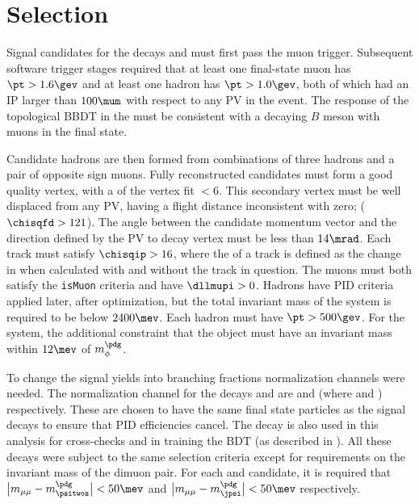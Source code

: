 \section{Selection}

Signal candidates for the decays \btokpipimumu and \btophikmumu must first pass the \lone muon
trigger.
Subsequent software trigger stages required that at least one final-state muon has $\pt>1.6\gev$
and at least one hadron has $\pt>1.0\gev$, both of which had an IP larger than $100\mum$ with
respect to any PV in the event.
The response of the topological BBDT in the \hlttwo must be consistent with a decaying $B$ meson
with muons in the final state.


Candidate \Bp hadrons are then formed from combinations of three hadrons and a pair of opposite
sign muons.
Fully reconstructed candidates must form a good quality vertex, with a \chisq of the vertex fit
$<6$.
This secondary vertex must be well displaced from any PV, having a flight distance inconsistent
with zero; ($\chisqfd>121$).
The angle between the \Bp candidate momentum vector and the direction defined by the PV to \Bp decay
vertex must be less than $14\mrad$.
Each track must satisfy $\chisqip>16$, where the \chisqip of a track is defined as the change in
\chisqip when calculated with and without the track in question.
The muons must both satisfy the {\tt isMuon} criteria and have $\dllmupi>0$.
Hadrons have PID criteria applied later, after optimization, but the total invariant mass of the
\kpipi system is required to be below $2400\mev$.
Each hadron must have $\pt>500\gev$.
For the \phik system, the additional constraint that the \decay{\phi}{\kk} object must have an
invariant mass within $12\mev$ of $m_\phi^\pdg$.

To change the signal yields into branching fractions normalization channels were needed.
The normalization channel for the decays \btokpipimumu and \btophikmumu are \btopsitwosk and
\btojpsiphik (where \psitwostojpsipipi and \jpsitomumu) respectively.
These are chosen to have the same final state particles as the signal decays to ensure that PID
efficiencies cancel.
The decay \btojpsikpipi is also used in this analysis for cross-checks and in training the BDT (as
described in ).
All these decays were subject to the same selection criteria except for requirements on the
invariant mass of the dimuon pair.
For each \psitwos and \jpsi candidate, it is required that
$\big|m_{\mu\mu}-m_{\psitwos}^\pdg\big|<50\mev$ and
$\big|m_{\mu\mu}-m_\jpsi^\pdg\big|<50\mev$ respectively.



